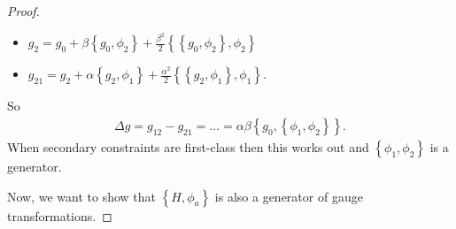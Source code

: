 \begin{proof}
\begin{itemize}
\item $g_2 = g_0 + \beta \left\{ g_0 , \phi_2 \right \} + \frac{\beta^2}{2} \left \{ \left \{ g_0 , \phi_2 \right \} , \phi_2 \right \} $
\item $g_{21} = g_2 + \alpha \left\{ g_2 , \phi_1 \right \} + \frac{\alpha^2}{2} \left \{ \left \{ g_2 , \phi_1 \right \} , \phi_1 \right \} .$ 
\end{itemize}
So 
\begin{align}
\Delta g = g_{12} - g_{21} = \dots  = \alpha \beta \left \{ g_0 , \left \{ \phi_1 , \phi_2 \right \} \right \}.
\end{align}
When secondary constraints are first-class then this works out and $\left \{ \phi_1 , \phi_2 \right \}$ is a generator. 

\pagebreak

Now, we want to show that $\left\{ H , \phi_a \right \}$ is also a generator of gauge transformations. 


\end{proof}
